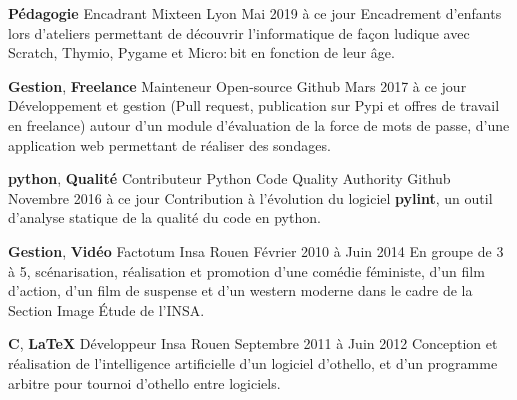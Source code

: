 \documentclass[11pt,a4paper]{moderncv}
\begin{document}
    \cventry
    {\textbf{Pédagogie}}
    {Encadrant}
    {Mixteen}
    {Lyon}
    {Mai 2019 à ce jour}{
      Encadrement d'enfants lors d'ateliers permettant de découvrir l’informatique de façon ludique avec
	  Scratch, Thymio, Pygame et Micro$:$bit en fonction de leur âge.
    }

    \cventry
    {\textbf{Gestion}, \textbf{Freelance}}
    {Mainteneur}
    {Open-source}
    {Github}
    {Mars 2017 à ce jour}{
      Développement et gestion (Pull request, publication sur Pypi et offres de travail en freelance)
	  autour d'un module d'évaluation de la force de mots de passe, d'une application web permettant de réaliser des
	  sondages.
    }

    \cventry
    {\textbf{python}, \textbf{Qualité}}
    {Contributeur}
    {Python Code Quality Authority}
    {Github}
    {Novembre 2016 à ce jour}{
      Contribution à l'évolution du logiciel \textbf{pylint}, un outil d'analyse statique de la qualité du code
      en python.
    }

    \cventry
    {\textbf{Gestion}, \textbf{Vidéo}}
    {Factotum}
    {Insa}
    {Rouen}
    {Février 2010 à Juin 2014}{
      En groupe de 3 à 5, scénarisation, réalisation et promotion d'une comédie
      féministe, d'un film d'action, d'un film de suspense et d'un western
      moderne dans le cadre de la Section Image Étude de l'INSA.
    }





    \cventry
    {\textbf{C}, \textbf{\LaTeX{}}}
    {Développeur}
    {Insa}
    {Rouen}
    {Septembre 2011 à Juin 2012}{
      Conception et réalisation de l'intelligence artificielle d'un logiciel
      d'othello, et d'un programme arbitre pour tournoi d'othello entre
      logiciels.
    }

\end{document}
